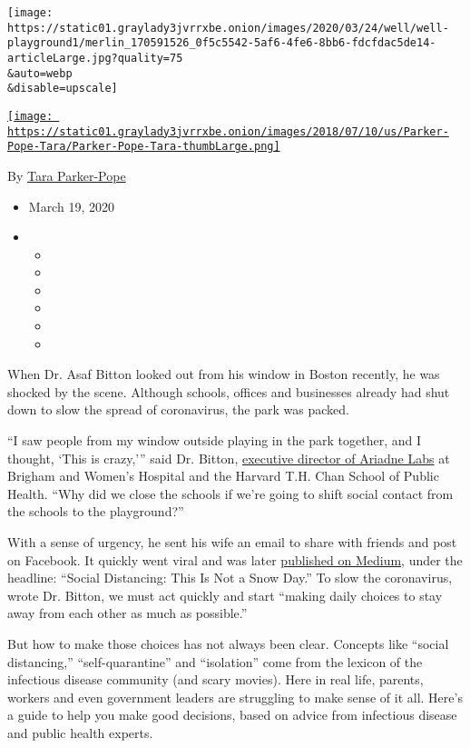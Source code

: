 \texttt{[image: https://static01.graylady3jvrrxbe.onion/images/2020/03/24/well/well-playground1/merlin\_170591526\_0f5c5542-5af6-4fe6-8bb6-fdcfdac5de14-articleLarge.jpg?quality=75\\\&auto=webp\\\&disable=upscale]}

\href{https://www.nytimes3xbfgragh.onion/by/tara-parker-pope}{\texttt{[image: https://static01.graylady3jvrrxbe.onion/images/2018/07/10/us/Parker-Pope-Tara/Parker-Pope-Tara-thumbLarge.png]}}

By \href{https://www.nytimes3xbfgragh.onion/by/tara-parker-pope}{Tara
Parker-Pope}

\begin{itemize}
\item
  March 19, 2020
\item
  \begin{itemize}
  \item
  \item
  \item
  \item
  \item
  \item
  \end{itemize}
\end{itemize}

When Dr. Asaf Bitton looked out from his window in Boston recently, he
was shocked by the scene. Although schools, offices and businesses
already had shut down to slow the spread of coronavirus, the park was
packed.

``I saw people from my window outside playing in the park together, and
I thought, `This is crazy,''' said Dr. Bitton,
\href{https://www.ariadnelabs.org/about-us/people/management/asaf-bitton/}{executive
director of Ariadne Labs} at Brigham and Women's Hospital and the
Harvard T.H. Chan School of Public Health. ``Why did we close the
schools if we're going to shift social contact from the schools to the
playground?''

With a sense of urgency, he sent his wife an email to share with friends
and post on Facebook. It quickly went viral and was later
\href{https://www.ariadnelabs.org/resources/articles/news/social-distancing-this-is-not-a-snow-day/}{published
on Medium}, under the headline: ``Social Distancing: This Is Not a Snow
Day.'' To slow the coronavirus, wrote Dr. Bitton, we must act quickly
and start ``making daily choices to stay away from each other as much as
possible.''

But how to make those choices has not always been clear. Concepts like
``social distancing,'' ``self-quarantine'' and ``isolation'' come from
the lexicon of the infectious disease community (and scary movies). Here
in real life, parents, workers and even government leaders are
struggling to make sense of it all. Here's a guide to help you make good
decisions, based on advice from infectious disease and public health
experts.

